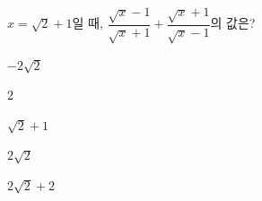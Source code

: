 \hspace*{2mm}\begin{minipage}[t]{\dimexpr\linewidth-2mm\relax}\vspace{0pt}
$x=\sqrt{2}+1$일 때, $\dfrac{\sqrt{x}-1}{\sqrt{x}+1}+\dfrac{\sqrt{x}+1}{\sqrt{x}-1}$의 값은?
\begin{choices32}{\rule[-3ex]{0pt}{8ex}$-2\sqrt{2}$}{\rule[-3ex]{0pt}{8ex}$2$}{\rule[-3ex]{0pt}{8ex}$\sqrt{2}+1$}{\rule[-3ex]{0pt}{8ex}$2\sqrt{2}$}{\rule[-3ex]{0pt}{8ex}$2\sqrt{2}+2$}\end{choices32}\end{minipage}
